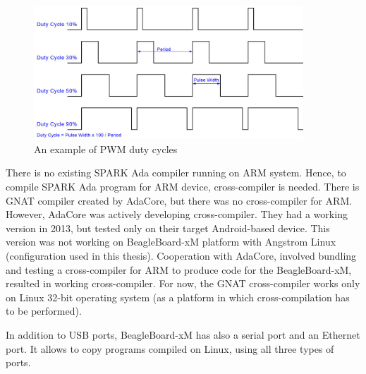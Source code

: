 \begin{figure}[ht]%
    \begin{center}
      \includegraphics[width=0.9\textwidth]{figures/pwm.png}      
    \end{center}
    \caption{An example of PWM duty cycles}
    \label{figure:pwm}
\end{figure}

There is no existing SPARK Ada compiler running on ARM system. Hence, to compile SPARK Ada program for ARM device, cross-compiler is needed. There is GNAT compiler \cite{Horn:Thesis} created by AdaCore, but there was no cross-compiler for ARM. However, AdaCore was actively developing cross-compiler. They had a working version in 2013, but tested only on their target Android-based device. This version was not working on BeagleBoard-xM platform with Angstrom Linux (configuration used in this thesis). Cooperation with AdaCore, involved bundling and testing a cross-compiler for ARM to produce code for the BeagleBoard-xM, resulted in working cross-compiler. For now, the GNAT cross-compiler works only on Linux 32-bit operating system (as a platform in which cross-compilation has to be performed).

In addition to USB ports, BeagleBoard-xM has also a serial port and an Ethernet port. It allows to copy programs compiled on Linux, using all three types of ports. 
